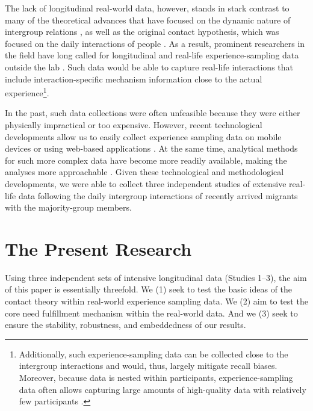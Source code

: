 \documentclass[man, 12pt, a4paper, mask]{apa7}
\theoremstyle{break}
\theoremstyle{plain}
\begin{document}
The lack of longitudinal real-world data, however, stands in stark contrast to many of the theoretical advances that have focused on the dynamic nature of intergroup relations \citep[e.g.,][]{Pettigrew1998}, as well as the original contact hypothesis, which was focused on the daily interactions of people \citep[][]{Allport1954b}. As a result, prominent researchers in the field have long called for longitudinal \citep[][]{Pettigrew1998, Pettigrew2008, Pettigrew2011} and real-life experience-sampling data outside the lab \citep[ESM][]{MacInnis2015, McKeown2017}. Such data would be able to capture real-life interactions that include interaction-specific mechanism information close to the actual experience\footnote{Additionally, such experience-sampling data can be collected close to the intergroup interactions and would, thus, largely mitigate recall biases. Moreover, because data is nested within participants, experience-sampling data often allows capturing large amounts of high-quality data with relatively few participants \citep[][]{shiffman2008}.}.

In the past, such data collections were often unfeasible because they were either physically impractical or too expensive. However, recent technological developments allow us to easily collect experience sampling data on mobile devices \citep[e.g.,][]{Keil2020} or using web-based applications \citep[e.g.,][]{Arslan2020}. At the same time, analytical methods for such more complex data have become more readily available, making the analyses more approachable \citep[e.g., see][]{ODonnell2021}. Given these technological and methodological developments, we were able to collect three independent studies of extensive real-life data following the daily intergroup interactions of recently arrived migrants with the majority-group members.  

\section{The Present Research}
Using three independent sets of intensive longitudinal data (Studies 1–3), the aim of this paper is essentially threefold. We (1) seek to test the basic ideas of the contact theory within real-world experience sampling data. We (2) aim to test the core need fulfillment mechanism within the real-world data. And we (3) seek to ensure the stability, robustness, and embeddedness of our results.
\end{document}

